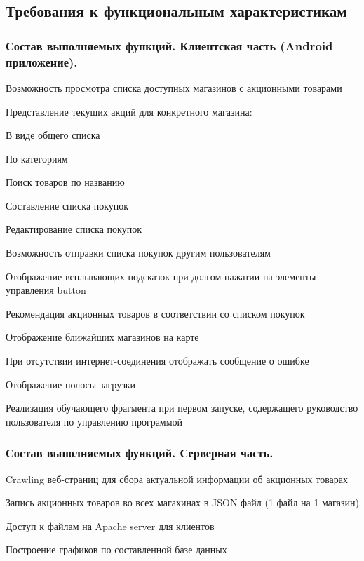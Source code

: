 \subsection{Требования к функциональным характеристикам}

\subsubsection{Состав выполняемых функций. Клиентская часть (Android приложение).}
\begin{my_enumerate}
\item Возможность просмотра списка доступных магазинов с акционными товарами
\item Представление текущих акций для конкретного магазина:
    \begin{my_enumerate}
    \item В виде общего списка
    \item По категориям
    \end{my_enumerate}
\item Поиск товаров по названию
\item Составление списка покупок
\item Редактирование списка покупок
\item Возможность отправки списка покупок другим пользователям
\item Отображение всплывающих подсказок при долгом нажатии на элементы управления button
\item Рекомендация акционных товаров в соответствии со списком покупок
\item Отображение ближайших магазинов на карте
\item При отсутствии интернет-соединения отображать сообщение о ошибке
\item Отображение полосы загрузки
\item Реализация обучающего фрагмента при первом запуске, содержащего руководство пользователя по управлению программой
\end{my_enumerate}

\subsubsection{Состав выполняемых функций. Серверная часть.}
\begin{my_enumerate}
\item Crawling веб-страниц для сбора актуальной информации об акционных товарах
\item Запись акционных товаров во всех магахинах в JSON файл (1 файл на 1 магазин)
\item Доступ к файлам на Apache server для клиентов
\item Построение графиков по составленной базе данных
\end{my_enumerate}

